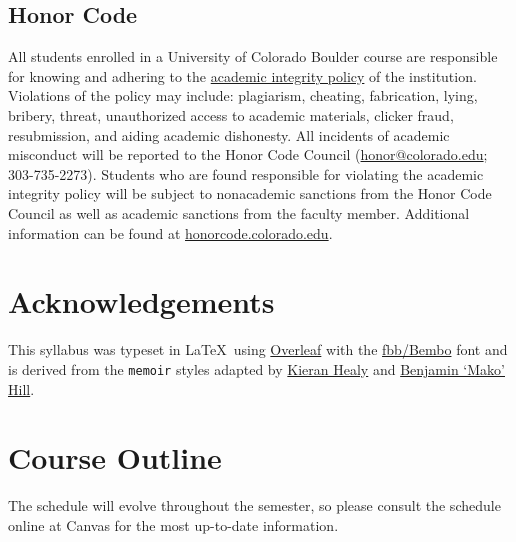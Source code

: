 \documentclass[10pt]{memoir}
\begin{document}
\subsection{Honor Code}
All students enrolled in a University of Colorado Boulder course are responsible for knowing and adhering to the \href{http://www.colorado.edu/policies/academic-integrity-policy}{academic integrity policy} of the institution. Violations of the policy may include: plagiarism, cheating, fabrication, lying, bribery, threat, unauthorized access to academic materials, clicker fraud, resubmission, and aiding academic dishonesty. All incidents of academic misconduct will be reported to the Honor Code Council (\href{mailto:honor@colorado.edu}{honor@colorado.edu}; 303-735-2273). Students who are found responsible for violating the academic integrity policy will be subject to nonacademic sanctions from the Honor Code Council as well as academic sanctions from the faculty member. Additional information can be found at \href{http://honorcode.colorado.edu}{honorcode.colorado.edu}. 

\section{Acknowledgements}

This syllabus was typeset in \LaTeX~using \href{http://www.sharelatex.com}{Overleaf} with the \href{http://www.tug.dk/FontCatalogue/fbb/}{fbb/Bembo} font and is derived from the \texttt{memoir} styles adapted by \href{https://github.com/kjhealy/latex-custom-kjh}{Kieran Healy} and \href{http://projects.mako.cc/source/?p=latex_mako;a=summary}{Benjamin `Mako' Hill}.

\clearpage

\section{\textbf{Course Outline}}

The schedule will evolve throughout the semester, so please consult the schedule online at Canvas for the most up-to-date information.
\end{document}
